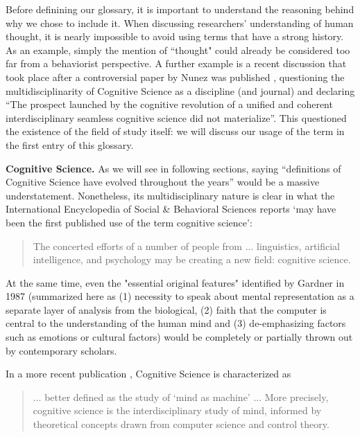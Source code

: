 \documentclass[../main.tex]{subfiles}
\begin{document}
Before definining our glossary, it is important to understand the reasoning behind why we chose to include it. When discussing researchers' understanding of human thought, it is nearly impossible to avoid using terms that have a strong history. As an example, simply the mention of ``thought" could already be considered too far from a behaviorist perspective. A further example is a recent discussion that took place after a controversial paper by Nunez was published  \parencite{nunezWhatHappenedCognitive2019}, questioning the multidisciplinarity of Cognitive Science as a discipline (and journal) and declaring \enquote{The prospect launched by the cognitive revolution of a unified and coherent interdisciplinary seamless cognitive science did not materialize}. This questioned the existence of the field of study itself: we will discuss our usage of the term in the first entry of this glossary.


\vspace{5pt}
\textbf{Cognitive Science.} As we will see in following sections, saying \enquote{definitions of Cognitive Science have evolved throughout the years} would be a massive understatement. Nonetheless, its multidisciplinary nature is clear in what the International Encyclopedia of Social \& Behavioral Sciences  \parencite{InternationalEncyclopediaSocial} reports \enquote*{may have been the first published use of the term cognitive science}:
\begin{quote}
    The concerted efforts of a number of people from ... linguistics, artificial intelligence, and psychology may be creating a new field: cognitive science.
\end{quote}

At the same time, even the "essential original features" identified by Gardner in 1987  \parencite{gardnerMindNewScience1987} (summarized here as (1) necessity to speak about mental representation as a separate layer of analysis from the biological, (2) faith that the computer is central to the understanding of the human mind and (3) de-emphasizing factors such as emotions or cultural factors) would be completely or partially thrown out by contemporary scholars.

In a more recent publication \parencite{bodenMindMachineHistory2008}, Cognitive Science is characterized as
\begin{quote}
    ... better defined as the study of ‘mind as machine’ ... More precisely, cognitive science is the interdisciplinary study of mind, informed by theoretical concepts drawn from computer science and control theory.
\end{quote}
\end{document}
